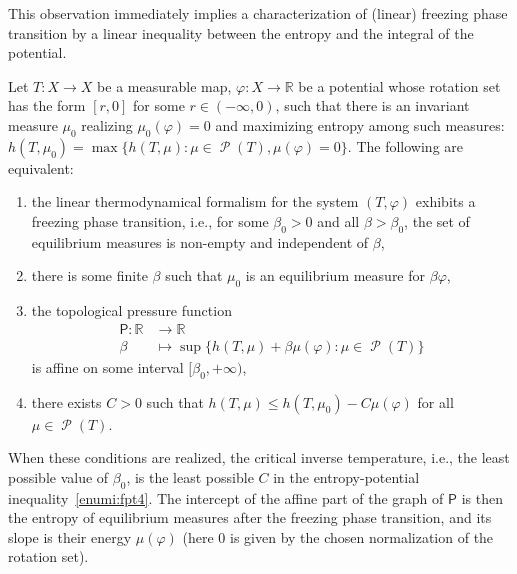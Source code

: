 \documentclass[AHL, Unicode, longabstracts,published]{cedram}
\theoremstyle{plain}
\theoremstyle{plain}
\newcommand\Prob{{\operatorname{\mathscr{P}}}}
\newcommand{\Pf}{\mathsf{P}}
\newcommand{\pot}{\varphi}
\newcommand*\8{\infty}
\newcommand\RR{\mathbb{R}}
\newcommand*{\romanenumi}{\renewcommand*{\theenumi}{\roman{enumi}}}
\begin{document}
This observation immediately implies a characterization of (linear) freezing phase transition by a linear inequality between the entropy and the integral of the potential.

\begin{prop}\label{prop-fpt}
Let $T:X\to X$ be a measurable map, $\pot:X\to\RR$ be a potential whose rotation set has the form $[r,0]$ for some $r\in(-\infty,0)$, such that there is an invariant measure $\mu_0$ realizing $\mu_0(\pot) = 0$ and maximizing entropy among such measures: $h(T,\mu_0)=\max \{h(T,\mu) \colon \mu\in \Prob(T), \mu(\pot)=0\}$. The following are equivalent:
\begin{enumerate}\romanenumi
\item\label{enumi:fpt1}
the linear thermodynamical formalism for the system $(T,\pot)$ exhibits a freezing phase transition, i.e., for some $\beta_0>0$ and all $\beta>\beta_0$, the set of equilibrium measures is non-empty and independent of $\beta$,
\item\label{enumi:fpt2}
there is some finite $\beta$ such that $\mu_0$ is an equilibrium measure for $\beta\pot$,
\item\label{enumi:fpt3}
the topological pressure function
\begin{align*}
\Pf \colon \RR &\to \RR \\
\beta &\mapsto \sup \{ h(T,\mu) + \beta\mu(\pot) \colon \mu\in\Prob(T) \}
\end{align*}
is affine on some interval $[\beta_0,+\infty)$,
\item\label{enumi:fpt4}
there exists $C>0$ such that $h(T,\mu) \le h(T,\mu_0) -C \mu(\pot)$ for all $\mu\in\Prob(T)$.
\end{enumerate}
When these conditions are realized, the critical inverse temperature, i.e., the least possible value of $\beta_0$, is the least possible $C$ in the entropy-potential inequality~\eqref{enumi:fpt4}. The intercept of the affine part of the graph of $\Pf$ is then the entropy of equilibrium measures after the freezing phase transition, and its slope is their energy $\mu(\pot)$ (here $0$ is given by the chosen normalization of the rotation set).
\end{prop}
\end{document}
